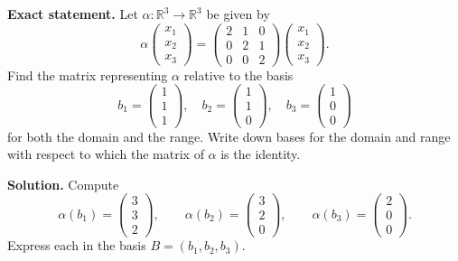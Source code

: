 \documentclass[12pt,a4paper]{article}
\theoremstyle{plain}
\theoremstyle{definition}      %
\begin{document}
\textbf{Exact statement.}
Let $\alpha:\mathbb R^3\to\mathbb R^3$ be given by
\[
\alpha\begin{pmatrix}x_1\\x_2\\x_3\end{pmatrix}
=
\begin{pmatrix}
	2&1&0\\
	0&2&1\\
	0&0&2
\end{pmatrix}
\begin{pmatrix}x_1\\x_2\\x_3\end{pmatrix}.
\]
Find the matrix representing $\alpha$ relative to the basis
\[
b_1=\begin{pmatrix}1\\1\\1\end{pmatrix},\quad
b_2=\begin{pmatrix}1\\1\\0\end{pmatrix},\quad
b_3=\begin{pmatrix}1\\0\\0\end{pmatrix}
\]
for both the domain and the range.
Write down bases for the domain and range with respect to which the matrix of $\alpha$ is the identity.

\textbf{Solution.}
Compute
\[
\alpha(b_1)=\begin{pmatrix}3\\3\\2\end{pmatrix},\qquad
\alpha(b_2)=\begin{pmatrix}3\\2\\0\end{pmatrix},\qquad
\alpha(b_3)=\begin{pmatrix}2\\0\\0\end{pmatrix}.
\]
Express each in the basis $B=(b_1,b_2,b_3)$.
\end{document}
